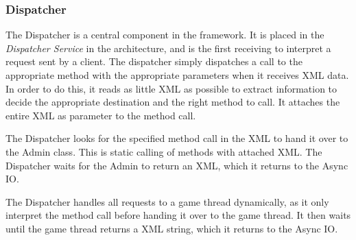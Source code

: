 \subsubsection{Dispatcher}\label{subsec:dispatcherdesign}
The Dispatcher is a central component in the framework. It is placed in the \textit{Dispatcher Service} in the architecture, and is the first receiving to interpret a request sent by a client. The dispatcher simply dispatches a call to the appropriate method with the appropriate parameters when it receives XML data. In order to do this, it reads as little XML as possible to extract information to decide the appropriate destination and the right method to call. It attaches the entire XML as parameter to the method call.

The Dispatcher looks for the specified method call in the XML to hand it over to the Admin class. This is static calling of methods with attached XML. The Dispatcher waits for the Admin to return an XML, which it returns to the Async IO.

The Dispatcher handles all requests to a game thread dynamically, as it only interpret the method call before handing it over to the game thread. It then waits until the game thread returns a XML string, which it returns to the Async IO.